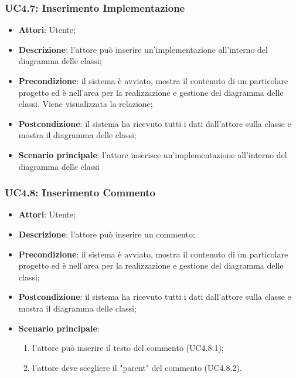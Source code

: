 \subsubsection{UC4.7: Inserimento Implementazione}
\label{UC4.7}
\begin{itemize}
	\item \textbf{Attori}: Utente;
	\item \textbf{Descrizione}: l'attore può inserire un'implementazione all'interno del diagramma delle classi;
	\item \textbf{Precondizione}: il sistema è avviato, mostra il contenuto di un particolare progetto ed è nell'area per la realizzazione e gestione del diagramma delle classi. Viene visualizzata la relazione;
	\item \textbf{Postcondizione}: il sistema ha ricevuto tutti i dati dall'attore sulla classe e mostra il diagramma delle classi;
	\item \textbf{Scenario principale}: l'attore inserisce un'implementazione all'interno del diagramma delle classi
\end{itemize}

\subsubsection{UC4.8: Inserimento Commento}
\label{UC4.8}
\begin{itemize}
	\item \textbf{Attori}: Utente;
	\item \textbf{Descrizione}: l'attore può inserire un commento;
	\item \textbf{Precondizione}: il sistema è avviato, mostra il contenuto di un particolare progetto ed è nell'area per la realizzazione e gestione del diagramma delle classi;
	\item \textbf{Postcondizione}: il sistema ha ricevuto tutti i dati dall'attore sulla classe e mostra il diagramma delle classi;
	\item \textbf{Scenario principale}:
	\begin{enumerate}
		\item l'attore può inserire il testo del commento (UC4.8.1);
		\item l'attore deve scegliere il "parent" del commento (UC4.8.2).
	\end{enumerate}
\end{itemize}

